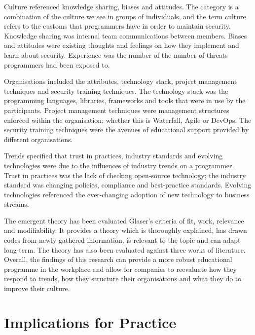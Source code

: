 \par
Culture referenced knowledge sharing, biases and attitudes. The category is a combination of the culture we see in groups of individuals, and the term culture refers to the customs that programmers have in order to maintain security. Knowledge sharing was internal team communications between members. Biases and attitudes were existing thoughts and feelings on how they implement and learn about security. Experience was the number of the number of threats programmers had been exposed to. 
\newline
\par
Organisations included the attributes, technology stack, project management techniques and security training techniques. The technology stack was the programming languages, libraries, frameworks and tools that were in use by the participants. Project management techniques were management structures enforced within the organisation; whether this is Waterfall, Agile or DevOps. The security training techniques were the avenues of educational support provided by different organisations.  
\newline
\par
Trends specified that trust in practices, industry standards and evolving technologies were due to the influences of industry trends on a programmer. Trust in practices was the lack of checking open-source technology; the industry standard was changing policies, compliance and best-practice standards. Evolving technologies referenced the ever-changing adoption of new technology to business streams.
\newline
\par 
The emergent theory has been evaluated Glaser's criteria of fit, work, relevance and modifiability. It provides a theory which is thoroughly explained, has drawn codes from newly gathered information, is relevant to the topic and can adapt long-term. The theory has also been evaluated against three works of literature. Overall, the findings of this research can provide a more robust educational programme in the workplace and allow for companies to reevaluate how they respond to trends, how they structure their organisations and what they do to improve their culture.

\section{Implications for Practice}

